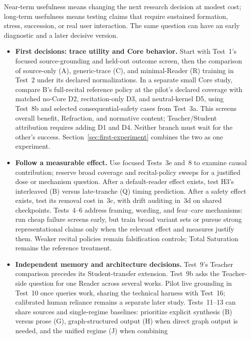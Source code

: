\documentclass[11pt]{article}
\begin{document}
Near-term usefulness means changing the next research decision at modest cost;
long-term usefulness means testing claims that require sustained formation,
stress, succession, or real user interaction. The same question can have an
early diagnostic and a later decisive version.
\begin{itemize}[leftmargin=*]
    \item \textbf{First decisions: trace utility and Core behavior.} Start with
    Test~1's focused source-grounding and held-out outcome screen, then the
    comparison of source-only (A), generic-trace (C), and minimal-Reader (R)
    training in Test~2 under its declared normalizations. In a
    separate small Core study, compare B's full-recital reference policy at
    the pilot's declared coverage with matched no-Core D2, recitation-only D3,
    and neutral-kernel D5, using
    Test~8b and selected consequential-safety cases from Test~3a. This screens
    overall benefit, Refraction, and normative content; Teacher/Student
    attribution requires adding D1 and D4. Neither branch must wait for the
    other's success. Section~\ref{sec:first-experiment} combines the two as one
    experiment.
    \item \textbf{Follow a measurable effect.} Use focused Tests~3e and~8 to
    examine causal contribution; reserve broad coverage and recital-policy
    sweeps for a justified dose or mechanism question. After a default-reader
    effect exists, test H3's interleaved (B) versus late-tranche (Q) timing
    prediction. After a safety effect
    exists, test its removal cost in~3c, with drift auditing in~3d on shared
    checkpoints. Tests~4--6 address framing, wording, and fear--care mechanisms:
    run cheap failure screens early, but train broad variant sets or pursue
    strong representational claims only when the relevant effect and measures
    justify them. Weaker recital policies remain falsification controls;
    Total Saturation remains the reference treatment.
        \item \textbf{Independent memory and architecture decisions.} Test~9's
    Teacher comparison precedes its Student-transfer extension. Test~9b asks
    the Teacher-side question for one Reader across several works. Pilot live
    grounding in Test~10 once queries work, sharing the technical harness with
    Test~16; calibrated human reliance remains a separate later study.
    Tests~11--13 can share sources and single-regime baselines: prioritize
    explicit synthesis (B) versus prose (G), graph-structured output (H) when
    direct graph output is needed, and the unified regime (J) when combining

\end{itemize}
\end{document}
